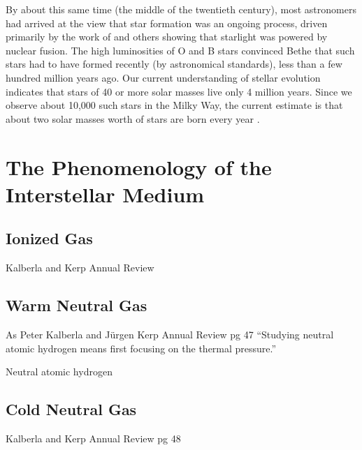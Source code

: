 \documentclass[../dissertation.tex]{subfiles}
\begin{document}
By about this same time (the middle of the twentieth century), most astronomers had arrived at the view that star formation was an ongoing process, 
driven primarily by the work of \citet{1939PhRv...55..434B}
and others showing that starlight was powered by nuclear fusion. 
The high luminosities of O and B stars convinced Bethe that such stars had to have formed recently (by astronomical standards), less than a few hundred million years ago. 
Our current understanding of stellar evolution indicates that stars of 40 or more solar masses live only 4 million years. 
Since we observe about 10,000 such stars in the Milky Way, the current estimate is that about two solar masses worth of stars are born every year \citep{2011AJ....142..197C}. 

\section{The Phenomenology of the Interstellar Medium}

\subsection{Ionized Gas}

Kalberla and Kerp Annual Review

\subsection{Warm Neutral Gas}
As Peter Kalberla and J{\"u}rgen Kerp Annual Review pg 47
``Studying neutral atomic hydrogen means first focusing on the thermal pressure.''

Neutral atomic hydrogen 


\subsection{Cold Neutral Gas}
Kalberla and Kerp Annual Review pg 48
\end{document}
